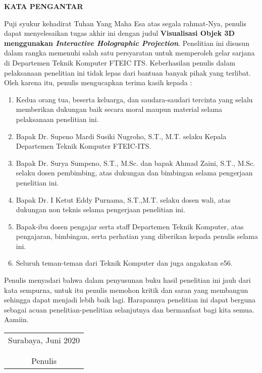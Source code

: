 \begin{center}
\Large\textbf{KATA PENGANTAR}
\end{center}

\setlength{\parindent}{1cm} Puji syukur kehadirat Tuhan Yang Maha Esa atas segala rahmat-Nya, penulis dapat menyelesaikan tugas akhir ini dengan judul \textbf{Visualisasi Objek 3D menggunakan \textit{Interactive Holographic Projection}}. Penelitian ini disusun dalam rangka memenuhi salah satu persyaratan untuk memperoleh gelar sarjana di Departemen Teknik Komputer FTEIC ITS. Keberhasilan penulis dalam pelaksanaan penelitian ini tidak lepas dari bantuan banyak pihak yang terlibat. Oleh karena itu, penulis mengucapkan terima kasih kepada :
\vspace{1ex}

\begin{enumerate}[nolistsep]
  \item Kedua orang tua, beserta keluarga, dan saudara-saudari tercinta yang selalu memberikan dukungan baik secara moral maupun material selama pelaksanaan penelitian ini.
  \item Bapak Dr. Supeno Mardi Susiki Nugroho, S.T., M.T. selaku Kepala Departemen Teknik Komputer FTEIC-ITS.
  \item Bapak Dr. Surya Sumpeno, S.T., M.Sc. dan bapak Ahmad Zaini, S.T., M.Sc. selaku dosen pembimbing, atas dukungan dan bimbingan selama pengerjaan penelitian ini.  
  \item Bapak Dr. I Ketut Eddy Purnama, S.T.,M.T. selaku dosen wali, atas dukungan non teknis selama pengerjaan penelitian ini.
  \item Bapak-ibu dosen pengajar serta staff Departemen Teknik Komputer, atas pengajaran, bimbingan, serta perhatian yang diberikan kepada penulis selama ini.
  \item Seluruh teman-teman dari Teknik Komputer dan juga angakatan e56.
\end{enumerate}
\vspace{1ex}

Penulis menyadari bahwa dalam penyusunan buku hasil penelitian ini jauh dari kata sempurna, untuk itu penulis memohon kritik dan saran yang membangun sehingga  dapat menjadi lebih baik lagi. Harapannya penelitian ini dapat berguna sebagai acuan penelitian-penelitian selanjutnya dan bermanfaat bagi kita semua. Aamiin.
\begin{flushright}
\begin{tabular}[b]{c}
  Surabaya, Juni 2020
  \\
  \\
  \\
  Penulis
\end{tabular}
\end{flushright}